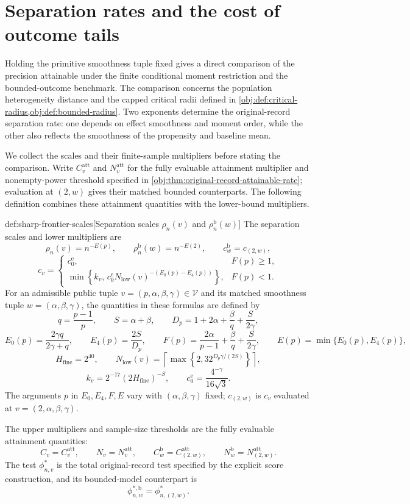 \section{Separation rates and the cost of outcome tails}

Holding the primitive smoothness tuple fixed gives a direct comparison of the precision attainable under the finite conditional moment restriction and the bounded-outcome benchmark. The comparison concerns the population heterogeneity distance and the capped critical radii defined in \cref{obj:def:critical-radius,obj:def:bounded-radius}. Two exponents determine the original-record separation rate: one depends on effect smoothness and moment order, while the other also reflects the smoothness of the propensity and baseline mean.

We collect the scales and their finite-sample multipliers before stating the comparison. Write \(C^{\mathrm{att}}_v\) and \(N^{\mathrm{att}}_v\) for the fully evaluable attainment multiplier and nonempty-power threshold specified in \cref{obj:thm:original-record-attainable-rate}; evaluation at \((2,w)\) gives their matched bounded counterparts. The following definition combines these attainment quantities with the lower-bound multipliers.

\begin{definitionv}{def:sharp-frontier-scales}[Separation scales \(\rho_n(v)\) and \(\rho_n^{\mathrm b}(w)\)]
The separation scales and lower multipliers are
\[
 \rho_n(v)=n^{-E(p)},\qquad
 \rho_n^{\mathrm b}(w)=n^{-E(2)},\qquad
 c_w^{\mathrm b}=c_{(2,w)},
\]
\[
 c_v=
 \begin{cases}
 c_0^{\mathrm e},&F(p)\ge1,\\
 \min\!\left\{k_v,\,
 c_0^{\mathrm e}N_{\mathrm{low}}(v)^{-(E_0(p)-E_4(p))}\right\},
 &F(p)<1.
 \end{cases}
\]
For an admissible public tuple \(v=(p,\alpha,\beta,\gamma)\in\mathcal V\) and its matched smoothness tuple \(w=(\alpha,\beta,\gamma)\), the quantities in these formulas are defined by
\[
 q=\frac{p-1}{p},\qquad S=\alpha+\beta,\qquad
 D_p=1+2\alpha+\frac{\beta}{q}+\frac{S}{2\gamma},
\]
\[
 E_0(p)=\frac{2\gamma q}{2\gamma+q},\qquad
 E_4(p)=\frac{2S}{D_p},\qquad
 F(p)=\frac{2\alpha}{p-1}+\frac{\beta}{q}+\frac{S}{2\gamma},
 \qquad E(p)=\min\{E_0(p),E_4(p)\},
\]
\[
 H_{\mathrm{fine}}=2^{40},\qquad
 N_{\mathrm{low}}(v)=
 \left\lceil\max\left\{2,32^{D_p\gamma/(2S)}\right\}\right\rceil,
\]
\[
 k_v=2^{-17}(2H_{\mathrm{fine}})^{-S},\qquad
 c_0^{\mathrm e}=\frac{4^{-\gamma}}{16\sqrt3}.
\]
The arguments \(p\) in \(E_0,E_4,F,E\) vary with \((\alpha,\beta,\gamma)\) fixed; \(c_{(2,w)}\) is \(c_v\) evaluated at \(v=(2,\alpha,\beta,\gamma)\).

The upper multipliers and sample-size thresholds are the fully evaluable attainment quantities:
\[
 C_v=C^{\mathrm{att}}_v,\qquad N_v=N^{\mathrm{att}}_v,\qquad
 C_w^{\mathrm b}=C^{\mathrm{att}}_{(2,w)},\qquad
 N_w^{\mathrm b}=N^{\mathrm{att}}_{(2,w)}.
\]
The test \(\phi^*_{n,v}\) is the total original-record test specified by the explicit score construction, and its bounded-model counterpart is
\[
 \phi^{*,\mathrm b}_{n,w}=\phi^*_{n,(2,w)}.
\]
\end{definitionv}

